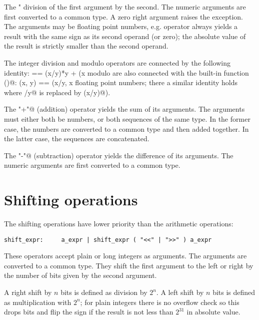 The \verb@"%"@ (modulo) operator yields the remainder from the
division of the first argument by the second.  The numeric arguments
are first converted to a common type.  A zero right argument raises
the \verb@ZeroDivisionError@ exception.  The arguments may be floating
point numbers, e.g.  %
operator always yields a result with the same sign as its second
operand (or zero); the absolute value of the result is strictly
smaller than the second operand.

The integer division and modulo operators are connected by the
following identity: \verb@x == (x/y)*y + (x%y)@.  Integer division and
modulo are also connected with the built-in function \verb@divmod()@:
\verb@divmod(x, y) == (x/y, x%y)@.  These identities don't hold for
floating point numbers; there a similar identity holds where
\verb@x/y@ is replaced by \verb@floor(x/y)@).

The \verb@"+"@ (addition) operator yields the sum of its arguments.
The arguments must either both be numbers, or both sequences of the
same type.  In the former case, the numbers are converted to a common
type and then added together.  In the latter case, the sequences are
concatenated.

The \verb@"-"@ (subtraction) operator yields the difference of its
arguments.  The numeric arguments are first converted to a common
type.

\section{Shifting operations}

The shifting operations have lower priority than the arithmetic
operations:

\begin{verbatim}
shift_expr:     a_expr | shift_expr ( "<<" | ">>" ) a_expr
\end{verbatim}

These operators accept plain or long integers as arguments.  The
arguments are converted to a common type.  They shift the first
argument to the left or right by the number of bits given by the
second argument.

A right shift by $n$ bits is defined as division by $2^n$.  A left
shift by $n$ bits is defined as multiplication with $2^n$; for plain
integers there is no overflow check so this drops bits and flip the
sign if the result is not less than $2^{31}$ in absolute value.

